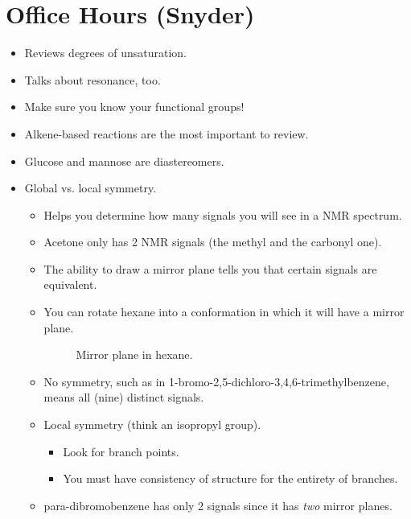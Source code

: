 \documentclass[../notes.tex]{subfiles}
\begin{document}
\section{Office Hours (Snyder)}
\begin{itemize}
    \item Reviews degrees of unsaturation.
    \item Talks about resonance, too.
    \item Make sure you know your functional groups!
    \item Alkene-based reactions are the most important to review.
    \item Glucose and mannose are diastereomers.
    \item Global vs. local symmetry.
    \begin{itemize}
        \item Helps you determine how many signals you will see in a  NMR spectrum.
        \item Acetone only has 2  NMR signals (the methyl and the carbonyl one).
        \item The ability to draw a mirror plane tells you that certain signals are equivalent.
        \item You can rotate hexane into a conformation in which it will have a mirror plane.
        \begin{figure}[h!]
            \centering
            \caption{Mirror plane in hexane.}
            \label{fig:hexaneMirrorPlane}
        \end{figure}
        \item No symmetry, such as in 1-bromo-2,5-dichloro-3,4,6-trimethylbenzene, means all (nine) distinct signals.
        \item Local symmetry (think an isopropyl group).
        \begin{itemize}
            \item Look for branch points.
            \item You must have consistency of structure for the entirety of branches.
        \end{itemize}
        \item para-dibromobenzene has only 2 signals since it has \emph{two} mirror planes.
    \end{itemize}
\end{itemize}
\end{document}
